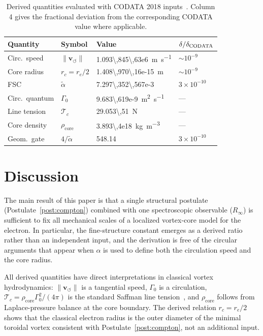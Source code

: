 \documentclass[aps,pra,preprint,longbibliography,nofootinbib]{revtex4-2}
\newcommand{\vnorm}{\lVert\mathbf{v}_{\!\boldsymbol{\circlearrowleft}}\rVert} %
\newcommand{\rhocore}{\rho_{\mathrm{core}}}      %
\newcommand{\rc}{r_c}                            %
\newcommand{\Rinf}{R_\infty}                     %
\newcommand{\Tc}{\mathcal{T}_c}                  %
\newcommand{\Gz}{\Gamma_0}                       %
\begin{document}
\begin{table}[h]
\centering
\caption{Derived quantities evaluated with CODATA 2018
inputs~\cite{MohrTaylor2018}.
Column 4 gives the fractional deviation from the corresponding CODATA
value where applicable.}
\label{tab:numbers}
\begin{tabular}{llll}
\toprule
Quantity & Symbol & Value & $\delta/\delta_{\rm CODATA}$ \\
\midrule
Circ.\ speed  & $\vnorm$      & \SI{1.093\,845\,63e6}{\meter\per\second}       & $\sim 10^{-9}$ \\
Core radius   & $\rc = r_e/2$ & \SI{1.408\,970\,16e-15}{\meter}                & $\sim 10^{-9}$ \\
FSC           & $\tilde\alpha$& \num{7.297\,352\,567e-3}                        & $3\times10^{-10}$ \\
Circ.\ quantum& $\Gz$         & \SI{9.683\,619e-9}{\meter\squared\per\second}  & — \\
Line tension  & $\Tc$         & \SI{29.053\,51}{\newton}                        & — \\
Core density  & $\rhocore$    & \SI{3.893\,4e18}{\kilogram\per\cubic\meter}     & — \\
Geom.\ gate   & $4/\tilde\alpha$ & \num{548.14}                               & $3\times10^{-10}$ \\
\bottomrule
\end{tabular}
\end{table}

\section{Discussion}
\label{sec:discussion}

The main result of this paper is that a single structural postulate
(Postulate~\ref{post:compton}) combined with one spectroscopic
observable ($\Rinf$) is sufficient to fix all mechanical scales of a
localized vortex-core model for the electron.
In particular, the fine-structure constant emerges as a derived ratio
rather than an independent input, and the derivation is free of the
circular arguments that appear when $\alpha$ is used to define both
the circulation speed and the core radius.

All derived quantities have direct interpretations in classical
vortex hydrodynamics: $\vnorm$ is a tangential speed, $\Gz$ is a
circulation, $\Tc = \rhocore\Gz^2/(4\pi)$ is the standard
Saffman line tension~\cite{Saffman1992}, and $\rhocore$ follows from
Laplace-pressure balance at the core boundary.
The derived relation $\rc = r_e/2$ shows that the classical electron
radius is the outer diameter of the minimal toroidal vortex consistent
with Postulate~\ref{post:compton}, not an additional input.
\end{document}

